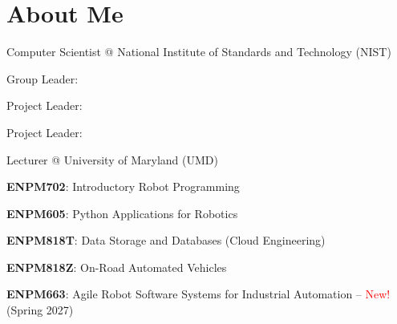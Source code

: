 \documentclass[
    10pt,
    dvipsnames,
    svgnames,
    x11names,
    aspectratio=1610,
    english,
    codeminted]{beamer}
\begin{document}

\section*{About Me}
\begingroup
{}
\begin{frame}
  \secdivheader{\secname}
  

    


\begin{compactitem}
        \item Computer Scientist @ National Institute of Standards and Technology (NIST)
        \begin{compactitem}
        \item Group Leader: 
        \begin{compactitem}
            \item Project Leader: 
            \item Project Leader: 
        \end{compactitem}
        \item Lecturer @ University of Maryland (UMD)
        \begin{compactitem}
            \item \textbf{ENPM702}: Introductory Robot Programming
            \item \textbf{ENPM605}: Python Applications for Robotics
            \item \textbf{ENPM818T}: Data Storage and Databases (Cloud Engineering)
            \item \textbf{ENPM818Z}:  On-Road Automated Vehicles
            \item \textbf{ENPM663}:  Agile Robot Software Systems for Industrial Automation -- \textcolor{red}{New!} (Spring 2027)
        \end{compactitem}
        \end{compactitem}
\end{compactitem}
\end{frame}
\end{document}
